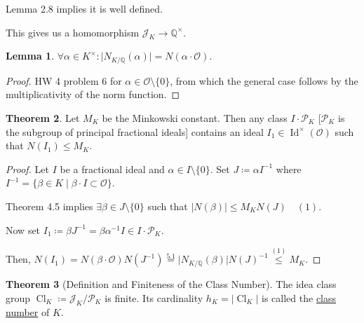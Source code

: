 \documentclass[openany]{amsbook}
\numberwithin{section}{chapter}
\theoremstyle{definition}
\newtheorem{theorem}{Theorem}[chapter]
\newtheorem{lemma}[theorem]{Lemma}
\begin{document}
Lemma 2.8 implies it is well defined.

This gives us a homomorphism \(\mathcal{J}_K \to \mathbb{Q}^\times \).

\begin{lemma}
    \(\forall \alpha \in K^\times: \vert N_{K / \mathbb{Q}} (\alpha) \vert = N(\alpha \cdot \mathcal{O})\).
\end{lemma}

\begin{proof}
    HW 4 problem 6 for \(\alpha \in \mathcal{O}\setminus \{ 0 \}\), from which the general case follows by the multiplicativity of the norm function. 
\end{proof}

\begin{theorem}
    Let \(M_K\) be the Minkowski constant. Then any class \(I \cdot \mathcal{P}_K\) [\(\mathcal{P}_K\) is the subgroup of principal fractional ideals] contains an ideal \(I_1 \in \operatorname{Id}^\times (\mathcal{O})\) such that \(N(I_1) \leq M_K\).
\end{theorem}

\begin{proof}
    Let \(I\) be a fractional ideal and \(\alpha \in I \setminus \{ 0 \} \). Set \(J\coloneqq \alpha I ^{-1}\) where \(I ^{-1} = \{ \beta \in K \mid \beta \cdot I \subset \mathcal{O} \} \). 

    Theorem 4.5 implies \(\exists \beta \in J \setminus \{ 0 \} \) such that \(\vert N(\beta) \vert \leq M_K N(J) \quad (1)\).

    Now set \(I_1 \coloneqq \beta J ^{-1} = \beta \alpha ^{-1} I \in I \cdot \mathcal{P}_K\).

    Then, \(N(I_1) = N(\beta\cdot \mathcal{O})N(J  ^{-1}) \overset{5.1}{=} \vert N_{K / \mathbb{Q}}(\beta) \vert N(J)^{-1} \overset{(1)}{\leq} M_K \). 
\end{proof}

\begin{theorem}
    [Definition and Finiteness of the Class Number]

    The idea class group \(\operatorname{Cl}_K \coloneqq \mathcal{J}_K / \mathcal{P}_K\) is finite. Its cardinality \(h_K = \vert \operatorname{Cl}_K \vert\) is called the \underline{class number} of \(K\). 
\end{theorem}
\end{document}
